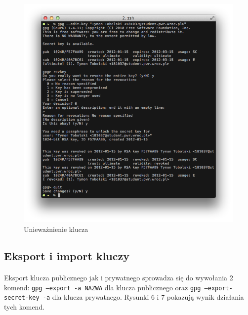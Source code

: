 \documentclass[wide,a4paper,titlepage,12pt] {article}
\begin{document}
  \begin{figure}[h!]
    \begin{center}
      \includegraphics[width=\textwidth]{img/5.png}
      \caption{Unieważnienie klucza}
    \end{center}
  \end{figure}

  \subsection{Eksport i import kluczy}
  \paragraph{}
  Eksport klucza publicznego jak i prywatnego sprowadza się do wywołania 2 komend: \texttt{gpg --export -a NAZWA} dla klucza publicznego oraz \texttt{gpg --export-secret-key -a} dla klucza prywatnego. Rysunki 6 i 7 pokazują wynik działania tych komend.
\end{document}
